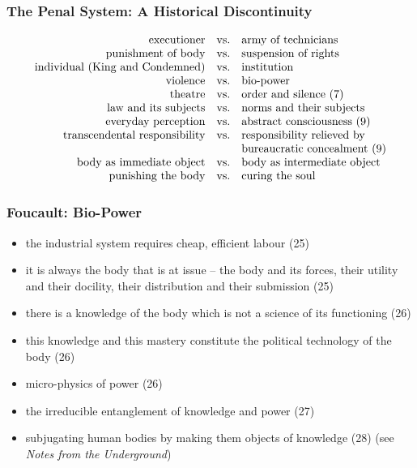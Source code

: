 \documentclass[xcolor=dvipsnames]{beamer}
\begin{document}
\begin{frame}
  \frametitle{The Penal System: A Historical Discontinuity}
  \begin{equation}
    \label{eq:zeiqueex}
    \begin{array}{rcl}
      \mbox{executioner} & \mbox{vs.} & \mbox{army of technicians} \\
      \mbox{punishment of body} & \mbox{vs.} & \mbox{suspension of rights} \\
      \mbox{individual (King and Condemned)} & \mbox{vs.} & \mbox{institution} \\
      \mbox{violence} & \mbox{vs.} & \mbox{bio-power} \\
      \mbox{theatre} & \mbox{vs.} & \mbox{order and silence (7)} \\
      \mbox{law and its subjects} & \mbox{vs.} & \mbox{norms and their subjects} \\
      \mbox{everyday perception} & \mbox{vs.} & \mbox{abstract consciousness (9)} \\
      \mbox{transcendental responsibility} & \mbox{vs.} & \mbox{responsibility relieved by} \\
      \mbox{} & \mbox{} & \mbox{bureaucratic concealment (9)} \\
      \mbox{body as immediate object} & \mbox{vs.} & \mbox{body as intermediate object} \\
      \mbox{punishing the body} & \mbox{vs.} & \mbox{curing the soul} \\
    \end{array}\notag
  \end{equation}
\end{frame}

\begin{frame}
  \frametitle{Foucault: Bio-Power}
  \begin{itemize}
  \item the industrial system requires cheap, efficient labour
    (25)
  \item it is always the body that is at issue -- the body and its
    forces, their utility and their docility, their distribution
    and their submission (25)
  \item there is a knowledge of the body which is not a science of
    its functioning (26)
  \item this knowledge and this mastery constitute the political
    technology of the body (26)
  \item micro-physics of power (26)
  \item the irreducible entanglement of knowledge and power (27)
  \item subjugating human bodies by making them objects of
    knowledge (28) (see \emph{Notes from the Underground})
  \end{itemize}
\end{frame}
\end{document}
